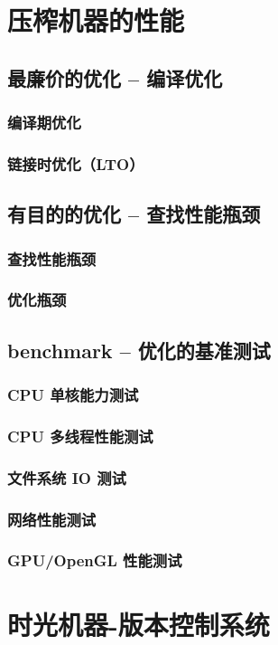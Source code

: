 \documentclass[amstex,twoside]{ctexbook}
\begin{document}
\chapter{压榨机器的性能}
\section{  最廉价的优化 – 编译优化	}
\subsection{  编译期优化	}
\subsection{  链接时优化（LTO）	}
\section{  有目的的优化 – 查找性能瓶颈}
\subsection{ 查找性能瓶颈}
\subsection{  优化瓶颈}
\section{  benchmark – 优化的基准测试}
\subsection{  CPU 单核能力测试}
\subsection{  CPU 多线程性能测试}
\subsection{  文件系统 IO 测试}
\subsection{  网络性能测试}
\subsection{  GPU/OpenGL 性能测试}


\chapter{时光机器-版本控制系统}\label{chap:VCS}
\end{document}
